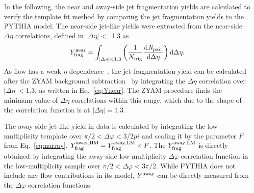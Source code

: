 In the following, the near and away-side jet fragmentation yields are calculated to verify the template fit method by comparing the jet fragmentation yields to the PYTHIA model.
The near-side jet-like yields were extracted from the near-side $\Delta\eta$ correlations, defined in $|\Delta\eta|<$~1.3 as
\begin{eqnarray}
Y^\mathrm{near}_{\rm{frag}} = \int_{|\Delta \eta|<1.3} \left( \frac{1}{\it{N}_{\rm{trig}}} \frac{ \rm{d}\it{}N_{\rm{pair}} }{ \rm{d}\Delta\eta } \right) \rm{d} \Delta\eta.
\label{eq:Ynear}
\end{eqnarray}
As flow has a weak $\eta$ dependence~\cite{ATLAS:2011ah,PHENIX:2018hho,ALICE:2016tlx}, the jet-fragmentation yield can be calculated after the ZYAM background subtraction~\cite{Ajitanand:2005jj} by integrating the $\Delta\eta$ correlation over $|\Delta\eta|<1.3$, as written in Eq.~\ref{eq:Ynear}. The ZYAM procedure finds the minimum value of $\Delta\eta$ correlations within this range, which due to the shape of the correlation function is at $|\Delta\eta|=1.3$.


The away-side jet-like yield in data is calculated by integrating the low-multiplicity template over $\pi/2<\Delta\varphi<3/2 pi$ and scaling it by the parameter $F$ from Eq.~\ref{eq:narray}, $Y^{\rm{away, HM}}_{\mathrm{frag}} = Y^{\rm{away, LM}}_{\mathrm{frag}} \times F$. The $Y^{\rm{away, LM}}_{\mathrm{frag}}$ is directly obtained by integrating the away-side low-multiplicity $\Delta\varphi$ correlation function in the low-multiplicity sample over $\pi/2 < \Delta\varphi < 3\pi/2$.
While PYTHIA does not include any flow contributions in its model, $Y^{\rm{away}}$ can be directly measured from the $\Delta\varphi$ correlation functions.

